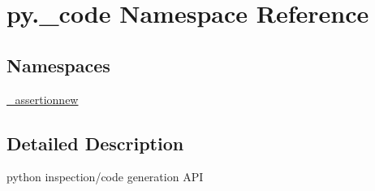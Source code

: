 \hypertarget{namespacepy_1_1__code}{}\section{py.\+\_\+code Namespace Reference}
\label{namespacepy_1_1__code}
\subsection*{Namespaces}
\begin{DoxyCompactItemize}
\item 
 \hyperlink{namespacepy_1_1__code_1_1__assertionnew}{\+\_\+assertionnew}
\end{DoxyCompactItemize}


\subsection{Detailed Description}
\begin{DoxyVerb}python inspection/code generation API \end{DoxyVerb}
 